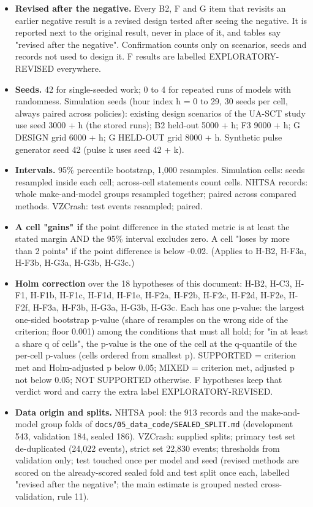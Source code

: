 \begin{itemize}
\item \textbf{Revised after the negative.} Every B2, F and G item that revisits an earlier negative result is a revised design tested after seeing the negative. It is reported next to the original result, never in place of it, and tables say "revised after the negative". Confirmation counts only on scenarios, seeds and records not used to design it. F results are labelled EXPLORATORY-REVISED everywhere.
\item \textbf{Seeds.} 42 for single-seeded work; 0 to 4 for repeated runs of models with randomness. Simulation seeds (hour index h = 0 to 29, 30 seeds per cell, always paired across policies): existing design scenarios of the UA-SCT study use seed 3000 + h (the stored runs); B2 held-out 5000 + h; F3 9000 + h; G DESIGN grid 6000 + h; G HELD-OUT grid 8000 + h. Synthetic pulse generator seed 42 (pulse k uses seed 42 + k).
\item \textbf{Intervals.} 95\% percentile bootstrap, 1,000 resamples. Simulation cells: seeds resampled inside each cell; across-cell statements count cells. NHTSA records: whole make-and-model groups resampled together; paired across compared methods. VZCrash: test events resampled; paired.
\item \textbf{A cell "gains" if} the point difference in the stated metric is at least the stated margin AND the 95\% interval excludes zero. A cell "loses by more than 2 points" if the point difference is below -0.02. (Applies to H-B2, H-F3a, H-F3b, H-G3a, H-G3b, H-G3c.)
\item \textbf{Holm correction} over the 18 hypotheses of this document: H-B2, H-C3, H-F1, H-F1b, H-F1c, H-F1d, H-F1e, H-F2a, H-F2b, H-F2c, H-F2d, H-F2e, H-F2f, H-F3a, H-F3b, H-G3a, H-G3b, H-G3c. Each has one p-value: the largest one-sided bootstrap p-value (share of resamples on the wrong side of the criterion; floor 0.001) among the conditions that must all hold; for "in at least a share q of cells", the p-value is the one of the cell at the q-quantile of the per-cell p-values (cells ordered from smallest p). SUPPORTED = criterion met and Holm-adjusted p below 0.05; MIXED = criterion met, adjusted p not below 0.05; NOT SUPPORTED otherwise. F hypotheses keep that verdict word and carry the extra label EXPLORATORY-REVISED.
\item \textbf{Data origin and splits.} NHTSA pool: the 913 records and the make-and-model group folds of \texttt{docs/05\_data\_code/SEALED\_SPLIT.md} (development 543, validation 184, sealed 186). VZCrash: supplied splits; primary test set de-duplicated (24,022 events), strict set 22,830 events; thresholds from validation only; test touched once per model and seed (revised methods are scored on the already-scored sealed fold and test split once each, labelled "revised after the negative"; the main estimate is grouped nested cross-validation, rule 11).

\end{itemize}
